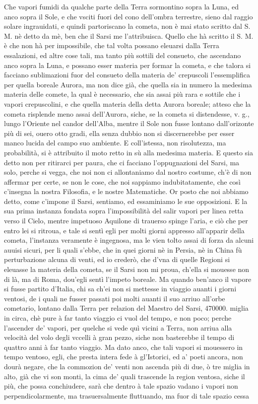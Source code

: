 \documentclass[11pt,twoside,openany]{book}
\begin{document}
Che vapori fumidi da qualche parte della Terra sormontino sopra la Luna, ed anco sopra il Sole, e che vsciti fuori del cono dell'ombra terrestre, sieno dal raggio solare ingrauidati, e quindi partoriscano la cometa, non è mai stato scritto dal S. M. nè detto da mè, ben che il Sarsi me l'attribuisca. Quello che hà scritto il S. M. è che non hà per impossibile, che tal volta possano eleuarsi dalla Terra essalazioni, ed altre cose tali, ma tanto più sottili del consueto, che ascendano anco sopra la Luna, e possano esser materia per formar la cometa, e che talora si facciano sublimazioni fuor del consueto della materia de' crepuscoli l'essemplifica per quella boreale Aurora, ma non dice già, che quella sia in numero la medesima materia delle comete, la qual è necessario, che sia assai più rara e sottile che i vapori crepuscolini, e che quella materia della detta Aurora boreale; atteso che la cometa risplende meno assai dell'Aurora, siche, se la cometa si distendesse, v. g., lungo l'Oriente nel candor dell'Alba, mentre il Sole non fusse lontano dall'orizonte più di sei, ouero otto gradi, ella senza dubbio non si discernerebbe per esser manco lucida del campo suo ambiente. E coll'istessa, non risolutezza, ma probabilità, si è attribuito il moto retto in sù alla medesima materia. E questo sia detto non per ritirarci per paura, che ci facciano l'oppugnazioni del Sarsi, ma solo, perche si vegga, che noi non ci allontaniamo dal nostro costume, ch'è di non affermar per certe, se non le cose, che noi sappiamo indubitatamente, che così c'insegna la nostra Filosofia, e le nostre Matematiche. Or posto che noi abbiamo detto, come c'impone il Sarsi, sentiamo, ed essaminiamo le sue opposizioni. E la sua prima instanza fondata sopra l'impossibilità del salir vapori per linea retta verso il Cielo, mentre impetuoso Aquilone di trauerso spinge l'aria, e ciò che per entro lei si ritroua, e tale si sentì egli per molti giorni appresso all'apparir della cometa, l'instanza veramente è ingegnosa, ma le vien tolto assai di forza da alcuni auuisi sicuri, per li quali s'ebbe, che in quei giorni nè in Persia, nè in China fù perturbazione alcuna di venti, ed io crederò, che d'vna di quelle Regioni si eleuasse la materia della cometa, se il Sarsi non mi proua, ch'ella si mouesse non di là, ma di Roma, dou'egli sentì l'impeto boreale. Ma quando ben'anco il vapore si fusse partito d'Italia, chi sa ch'ei non si mettesse in viaggio auanti i giorni ventosi, de i quali ne fusser passati poi molti auanti il suo arriuo all'orbe cometario, lontano dalla Terra per relazion del Maestro del Sarsi, 470000. miglia in circa, chè pure à far tanto viaggio ci vuol del tempo, e non poco; perche l'ascender de' vapori, per quelche si vede quì vicini a Terra, non arriua alla velocità del volo degli vccelli à gran pezzo, siche non basterebbe il tempo di quattro anni à far tanto viaggio. Ma dato anco, che tali vapori si mouessero in tempo ventoso, egli, che presta intera fede à gl'Istorici, ed a' poeti ancora, non dourà negare, che la commozion de' venti non ascenda più di due, ò tre miglia in alto, già che vi son monti, la cima de' quali trascende la region ventosa, siche il più, che possa conchiudere, sarà che dentro à tale spazio vadano i vapori non perpendicolarmente, ma trasuersalmente fluttuando, ma fuor di tale spazio cessa 
\end{document}
